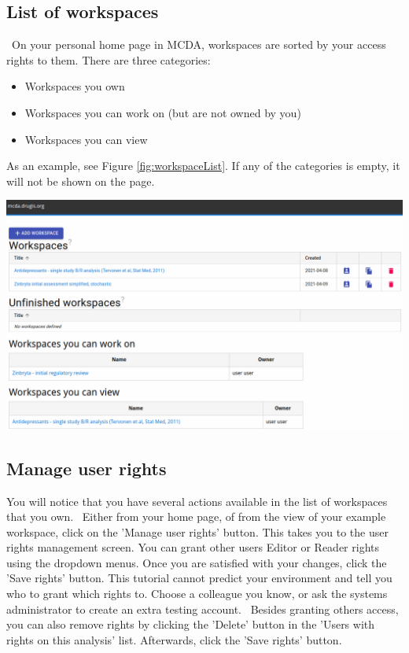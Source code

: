\documentclass[00_mcda_tutorial.tex]{subfiles}
\begin{document}
\begin{sidebar*}
\subsection*{List of workspaces}
\noindent \faLightbulbO \, On your personal home page in MCDA, workspaces are sorted by your access rights to them. There are three categories:
\begin{itemize}
\item Workspaces you own
\item Workspaces you can work on (but are not owned by you)
\item Workspaces you can view
\end{itemize}

As an example, see Figure \ref{fig:workspaceList}. If any of the categories is empty, it will not be shown on the page.

{	
	\centering
	\includegraphics[width=\textwidth]{fig/listWorkspaces.png}
	\label{fig:workspaceList}
	\par
}

\subsection*{Manage user rights}
\noindent You will notice that you have several actions available in the list of workspaces that you own.
\leftpointright \, Either from your home page, of from the view of your example workspace, click on the 'Manage user rights' button. This takes you to the user rights management screen. 
You can grant other users Editor or Reader rights using the dropdown menus. Once you are satisfied with your changes, click the 'Save rights' button. 
\noindent \faExclamationTriangle This tutorial cannot predict your environment and tell you who to grant which rights to. Choose a colleague you know, or ask the systems administrator to create an extra testing account.
\noindent \leftpointright \, Besides granting others access, you can also remove rights by clicking the 'Delete' button in the 'Users with rights on this analysis' list. Afterwards, click the 'Save rights' button.


\end{sidebar*}
\end{document}

